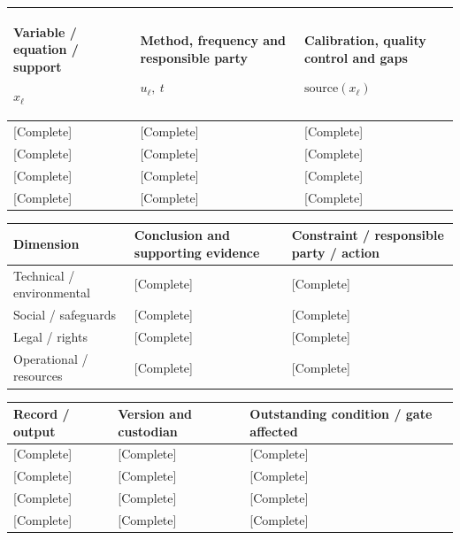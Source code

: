 {\sffamily\fontsize{8.3}{10.3}\selectfont\begin{longtable}{@{}P{49.49mm} P{64.34mm} P{51.14mm}@{}}
\toprule
\textbf{Variable / equation / support}\par {\normalfont\fontsize{8.2}{10}\selectfont $x_{\ell}$} & \textbf{Method, frequency and responsible party}\par {\normalfont\fontsize{8.2}{10}\selectfont $u_{\ell},\ t$} & \textbf{Calibration, quality control and gaps}\par {\normalfont\fontsize{8.2}{10}\selectfont $\text{source}(x_{\ell})$}\\\midrule\endhead
\rule{0pt}{7.7mm}[Complete] & [Complete] & [Complete]\\\hline
\rule{0pt}{7.7mm}[Complete] & [Complete] & [Complete]\\\hline
\rule{0pt}{7.7mm}[Complete] & [Complete] & [Complete]\\\hline
\rule{0pt}{7.7mm}[Complete] & [Complete] & [Complete]\\\hline
\end{longtable}}
{\sffamily\fontsize{8.3}{10.3}\selectfont\begin{longtable}{@{}P{47.84mm} P{65.99mm} P{51.14mm}@{}}
\toprule
\textbf{Dimension} & \textbf{Conclusion and supporting evidence} & \textbf{Constraint / responsible party / action}\\\midrule\endhead
\rule{0pt}{7.7mm}Technical / environmental & [Complete] & [Complete]\\\hline
\rule{0pt}{7.7mm}Social / safeguards & [Complete] & [Complete]\\\hline
\rule{0pt}{7.7mm}Legal / rights & [Complete] & [Complete]\\\hline
\rule{0pt}{7.7mm}Operational / resources & [Complete] & [Complete]\\\hline
\end{longtable}}
{\sffamily\fontsize{8.3}{10.3}\selectfont\begin{longtable}{@{}P{51.14mm} P{51.14mm} P{62.69mm}@{}}
\toprule
\textbf{Record / output} & \textbf{Version and custodian} & \textbf{Outstanding condition / gate affected}\\\midrule\endhead
\rule{0pt}{7.7mm}[Complete] & [Complete] & [Complete]\\\hline
\rule{0pt}{7.7mm}[Complete] & [Complete] & [Complete]\\\hline
\rule{0pt}{7.7mm}[Complete] & [Complete] & [Complete]\\\hline
\rule{0pt}{7.7mm}[Complete] & [Complete] & [Complete]\\\hline
\end{longtable}}
